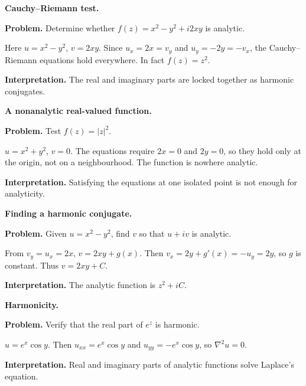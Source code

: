 \begin{workedexample}
\textbf{Cauchy--Riemann test.}\par
\textbf{Problem.} Determine whether $f(z)=x^2-y^2+i2xy$ is analytic.
\begin{solution}
Here $u=x^2-y^2$, $v=2xy$. Since $u_x=2x=v_y$ and $u_y=-2y=-v_x$, the Cauchy--Riemann equations hold everywhere. In fact $f(z)=z^2$.

\textbf{Interpretation.} The real and imaginary parts are locked together as harmonic conjugates.
\end{solution}
\end{workedexample}

\begin{workedexample}
\textbf{A nonanalytic real-valued function.}\par
\textbf{Problem.} Test $f(z)=|z|^2$.
\begin{solution}
$u=x^2+y^2$, $v=0$. The equations require $2x=0$ and $2y=0$, so they hold only at the origin, not on a neighbourhood. The function is nowhere analytic.

\textbf{Interpretation.} Satisfying the equations at one isolated point is not enough for analyticity.
\end{solution}
\end{workedexample}

\begin{workedexample}
\textbf{Finding a harmonic conjugate.}\par
\textbf{Problem.} Given $u=x^2-y^2$, find $v$ so that $u+iv$ is analytic.
\begin{solution}
From $v_y=u_x=2x$, $v=2xy+g(x)$. Then $v_x=2y+g'(x)=-u_y=2y$, so $g$ is constant. Thus $v=2xy+C$.

\textbf{Interpretation.} The analytic function is $z^2+iC$.
\end{solution}
\end{workedexample}

\begin{workedexample}
\textbf{Harmonicity.}\par
\textbf{Problem.} Verify that the real part of $e^z$ is harmonic.
\begin{solution}
$u=e^x\cos y$. Then $u_{xx}=e^x\cos y$ and $u_{yy}=-e^x\cos y$, so $\nabla^2u=0$.

\textbf{Interpretation.} Real and imaginary parts of analytic functions solve Laplace's equation.
\end{solution}
\end{workedexample}

